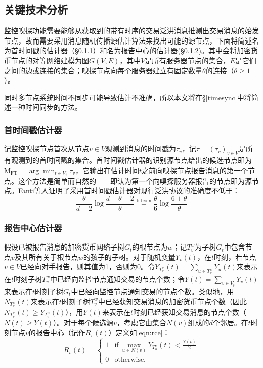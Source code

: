 \documentclass[supercite]{HustGraduPaper}
\newcommand{\reqn}[1]{\autoref{eqn:#1}}
\theoremstyle{definition}
\begin{document}
\subsection{关键技术分析}\label{sec:technique}
监控嗅探功能需要能够从获取到的带有时序的交易泛洪消息推测出交易消息的始发节点，故而需要采用消息随机传播源估计算法来找出可能的源节点，下面将简述名为首时间戳的估计器（\S \ref{fte}）和名为报告中心的估计器(\S \ref{rce})。其中会将加密货币节点的对等网络建模为图$G(V,E)$，其中$V$是所有服务器节点的集合，$E$是它们之间的边或连接的集合；嗅探节点向每个服务器建立有固定数量$\theta$的连接（$\theta\geq 1$）。

同时多节点系统时间不同步可能导致估计不准确，所以本文将在\S \ref{timesync}中将简述一种时间同步的方法。
\subsubsection{首时间戳估计器}\label{fte}
记监控嗅探节点首次从节点$v\in V$观测到消息的时间戳为$\tau_v$，记$\tau=(\tau_v )_{v\in V}$是所有观测到的首时间戳的集合。首时间戳估计器的识别源节点给出的候选节点即为$\text{M}_{\text{FT}} = \arg \min_{t\in V_t} \tau_v $，它输出在估计时间$t$之前向嗅探节点报告消息的第一个节点。这个方法是简单而自然的——即认为第一个向嗅探服务器报告的节点即为源节点。Fanti等人证明了\cite{fanti2017anonymity,fanti2017deanonymization}采用首时间戳估计器对现行泛洪协议的准确度不低于：
\begin{equation}
\frac{\theta}{d-2} \log{\frac{d+\theta - 2}{\theta}}\overset{\mathrm{bitcoin}}{=}\frac{\theta}{6} \log{\frac{6+\theta}{\theta}}
\end{equation}
\subsubsection{报告中心估计器}\label{rce}
假设已被报告消息的加密货币网络子树$G_t$的根节点为$w$；记$T_v^w$为子树$G_t$中包含节点$v$及其所有关于根节点$w$的孩子的子树。对于随机变量$Y_v (t)$，在$t$时刻，若节点$v\in V$已经向对手报告，则其值为1，否则为0。令$Y_{T_v^w} (t)=\sum\limits_{u\in T_v^w} Y_u (t)$来表示在$t$时刻子树$T_v^w$中已经向监控节点通知交易的节点个数；令$Y(t)=\sum\limits_{v\in V_t} Y_v (t)$来表示在$t$时刻子树$G_t$中已经向监控节点通知交易的节点个数。类似地，用$N_{T_v^w} (t)$来表示在$t$时刻子树$T_v^w$中已经获知交易消息的加密货币节点个数（因此$N_{T_v^w} (t)\geq Y_{T_v^w}(t)$），用$Y(t)$来表示在$t$时刻已经获知交易消息的节点个数（$N(t)\geq Y(t)$）。对于每个候选源$v$，考虑它由集合$N(v)$组成的$d$个邻居。在$t$时刻节点$v$的报告中心（记作$R_v (t)$）定义如\reqn{rce}：
\begin{equation}
  R_v(t)=\left\{
    \begin{array}{ll}
      1 & \text{if}\  \max_{u\in N(v)} Y_{T_u^v}(t)<\frac{Y(t)}{2}  \\
      0 & \text{otherwise.}
    \end{array}
  \right. \label{eqn:rce}
\end{equation}
\end{document}
